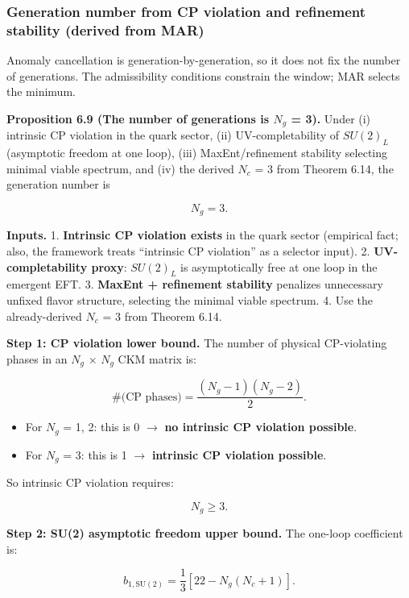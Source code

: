 \documentclass[11pt,a4paper]{article}
\theoremstyle{remark}
\providecommand{\tightlist}{%
  \setlength{\itemsep}{0pt}\setlength{\parskip}{0pt}}
\begin{document}
\subsubsection{Generation number from CP violation and refinement stability (derived from MAR)}\label{generation-number-from-cp-violation-and-refinement-stability-derived-from-mar}

Anomaly cancellation is generation-by-generation, so it does not fix the
number of generations. The admissibility conditions constrain the window;
MAR selects the minimum.

\textbf{Proposition 6.9 (The number of generations is \(N_g\) = 3).} Under (i)
intrinsic CP violation in the quark sector, (ii) UV-completability of
\(SU(2)_L\) (asymptotic freedom at one loop), (iii) MaxEnt/refinement
stability selecting minimal viable spectrum, and (iv) the derived \(N_c\) = 3
from Theorem 6.14, the generation number is

\[
N_g = 3.
\]

\textbf{Inputs.}
1. \textbf{Intrinsic CP violation exists} in the quark sector (empirical fact;
also, the framework treats ``intrinsic CP violation'' as a selector input).
2. \textbf{UV-completability proxy}: \(SU(2)_L\) is asymptotically free at one
loop in the emergent EFT.
3. \textbf{MaxEnt + refinement stability} penalizes unnecessary unfixed flavor
structure, selecting the minimal viable spectrum.
4. Use the already-derived \(N_c\) = 3 from Theorem 6.14.

\textbf{Step 1: CP violation lower bound.} The number of physical CP-violating
phases in an \(N_g\) \ensuremath{\times} \(N_g\) CKM matrix is:

\[
\#\text{(CP phases)} = \frac{(N_g - 1)(N_g - 2)}{2}.
\]

\begin{itemize}
\tightlist
\item
  For \(N_g\) = 1, 2: this is 0 \ensuremath{\to} \textbf{no intrinsic CP violation possible}.
\item
  For \(N_g\) = 3: this is 1 \ensuremath{\to} \textbf{intrinsic CP violation possible}.
\end{itemize}

So intrinsic CP violation requires:

\[
N_g \ge 3.
\]

\textbf{Step 2: SU(2) asymptotic freedom upper bound.} The one-loop
coefficient is:

\[
b_{1,\mathrm{SU}(2)} = \frac{1}{3}\left[22 - N_g(N_c + 1)\right].
\]
\end{document}
